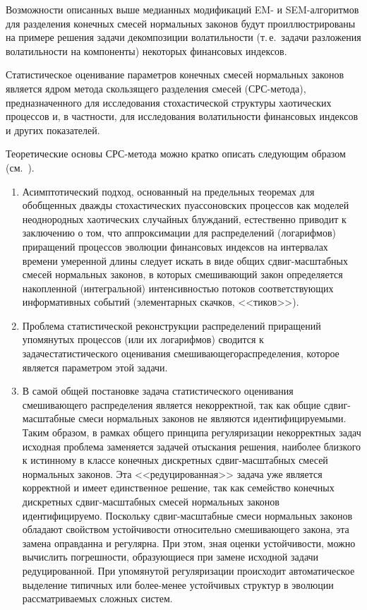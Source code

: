 \begin{multicols}{2}
Возможности описанных выше медианных модификаций EM- и
SEM-алгоритмов для разделения конечных смесей нормальных законов
будут проиллюстрированы на примере решения задачи декомпозиции
волатильности (т.\,е.\ задачи разложения волатильности на
компоненты) некоторых финансовых индексов.

Статистическое оценивание параметров конечных смесей нормальных
законов является ядром метода скользящего разделения смесей
(СРС-ме\-то\-да), предназначенного для исследования стохастической
структуры хаотических процессов и, в частности, для исследования
волатильности финансовых индексов и других показателей.

Теоретические основы СРС-метода можно кратко описать следующим
образом (см.~\cite{Korolev2007c, Korolev2007a}).

\begin{enumerate}[(1)]
\item %
Асимптотический подход, основанный на предельных
теоремах для обобщенных дважды стохастических пуассоновских
процессов как моделей неоднородных хаотических случайных
блужданий, естественно приводит к заключению о том, что
аппроксимации для распределений (логарифмов) приращений процессов
эволюции финансовых индексов на интервалах времени умеренной длины
следует искать в виде общих сдвиг-масштабных смесей нормальных
законов, в которых смешивающий закон определяется накопленной
(интегральной) интенсивностью потоков со\-от\-вет\-ст\-ву\-ющих
информативных событий (элементарных скачков, <<тиков>>).

\item Проблема статистической реконструкции распределений
приращений упомянутых процессов (или их логарифмов) сводится к
задаче\linebreak статистического оценивания смешивающего\linebreak распределения,
которое является параметром этой задачи.

\item В самой общей постановке задача статистического
оценивания смешивающего распределения является некорректной, так
как общие сдвиг-масштабные смеси нормальных законов не являются
идентифицируемыми. Таким образом, в рамках общего принципа
регуляризации некорректных задач исходная проблема заменяется
задачей отыскания решения, наиболее близкого к истинному в классе
конечных дискретных сдвиг-масштабных смесей нормальных законов.
Эта <<редуцированная>> задача уже является корректной и имеет
единственное решение, так как семейство конечных дискретных
сдвиг-масштабных смесей нормальных законов идентифицируемо.
Поскольку сдвиг-масштабные смеси нормальных законов обладают
свойством устойчивости относительно смешивающего закона, эта
замена оправданна и регулярна. При этом, зная оценки устойчивости,
можно вычислить погрешности, образующиеся при замене исходной
задачи редуцированной. При упомянутой регуляризации происходит
автоматическое выделение типичных или более-менее устойчивых
структур в эволюции рассматриваемых сложных систем.


\end{enumerate}
\end{multicols}
